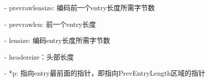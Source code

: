 \documentclass[UTF8,a4paper]{ctexart}
\begin{document}
	\begin{itemize}
		\small\item[-] prevrawlensize: 编码前一个entry长度所需字节数
		\small\item[-] prevrawlen: 前一个entry长度
		\small\item[-] lensize: 编码entry长度所需字节数
		\small\item[-] headersize：头部长度
		\small\item[-] *p: 指向entry最前面的指针，即指向PrevEntryLength区域的指针
	\end{itemize}


	
\end{document}
